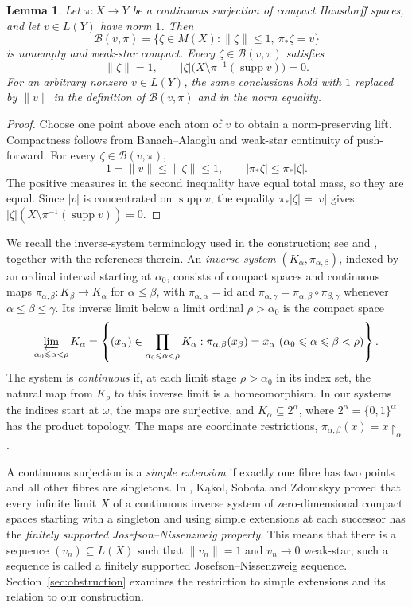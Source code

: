 \documentclass[a4paper,11pt]{amsart}
\theoremstyle{plain}
\newtheorem{lemma}[theorem]{Lemma}
\theoremstyle{definition}
\theoremstyle{remark}
\newcommand{\supp}{\operatorname{supp}}
\newcommand{\restr}[1]{{\restriction_{#1}}}
\numberwithin{equation}{section}
\begin{document}
\begin{lemma}\label{lem:lifts}
Let $\pi:X\to Y$ be a continuous surjection of compact Hausdorff spaces, and let $v\in L(Y)$ have norm $1$. Then
\[
\mathcal B(v,\pi)=\{\zeta\in M(X):\|\zeta\|\leqslant1,\ \pi_*\zeta=v\}
\]
is nonempty and weak-star compact. Every $\zeta\in\mathcal B(v,\pi)$
satisfies
\[
\|\zeta\|=1,\qquad |\zeta|\bigl(X\setminus\pi^{-1}(\supp v)\bigr)=0.
\]
For an arbitrary nonzero $v\in L(Y)$, the same conclusions hold with
$1$ replaced by $\|v\|$ in the definition of $\mathcal B(v,\pi)$ and in
the norm equality.
\end{lemma}
\begin{proof}
Choose one point above each atom of $v$ to obtain a norm-preserving lift. Compactness follows from Banach--Alaoglu and weak-star continuity of push-forward. For every $\zeta\in\mathcal B(v,\pi)$,
\[
1=\|v\|\leqslant\|\zeta\|\leqslant1,\qquad
|\pi_*\zeta|\leqslant\pi_*|\zeta|.
\]
The positive measures in the second inequality have equal total mass, so they are equal. Since $|v|$ is concentrated on $\supp v$, the equality $\pi_*|\zeta|=|v|$ gives $|\zeta|(X\setminus\pi^{-1}(\supp v))=0$.
\end{proof}

We recall the inverse-system terminology used in the construction; see
\cite[Sections~2.5 and 3.2]{Engelking} and
\cite[Section~20.5]{KKLPS}, together with the references therein.
An \emph{inverse system} $(K_\alpha,\pi_{\alpha,\beta})$, indexed by an
ordinal interval starting at $\alpha_0$, consists of compact spaces and continuous maps $\pi_{\alpha,\beta}:K_\beta\to K_\alpha$
for $\alpha\leqslant\beta$, with $\pi_{\alpha,\alpha}=\mathrm{id}$ and
$\pi_{\alpha,\gamma}=\pi_{\alpha,\beta}\circ\pi_{\beta,\gamma}$ whenever
$\alpha\leqslant\beta\leqslant\gamma$. Its inverse limit below a limit
ordinal $\rho>\alpha_0$ is the compact space
\[
\varprojlim_{\alpha_0\leqslant\alpha<\rho}K_\alpha
=\left\{(x_\alpha)\in\prod_{\alpha_0\leqslant\alpha<\rho}K_\alpha:
 \pi_{\alpha,\beta}(x_\beta)=x_\alpha\ (\alpha_0\leqslant\alpha\leqslant\beta<\rho)\right\}.
\]
The system is \emph{continuous} if, at each limit stage $\rho>\alpha_0$ in its
index set, the natural map from $K_\rho$ to this inverse limit is a
homeomorphism. In our systems the indices start at $\omega$, the maps
are surjective, and $K_\alpha\subseteq2^\alpha$, where
$2^\alpha=\{0,1\}^\alpha$ has the product topology. The maps are coordinate
restrictions, $\pi_{\alpha,\beta}(x)=x\restr{\alpha}$.

A continuous surjection is a \emph{simple extension} if exactly one fibre
has two points and all other fibres are singletons. In
\cite[Definition~6.1 and Theorem~6.10]{KSZ}, K\k{a}kol, Sobota and Zdomskyy
proved that every infinite limit $X$ of a continuous inverse system of
zero-dimensional compact spaces starting with a singleton and using
simple extensions at each successor has the \emph{finitely supported
Josefson--Nissenzweig property}. This means that there is a sequence
$(v_n)\subseteq L(X)$ such that $\|v_n\|=1$ and $v_n\to0$ weak-star;
such a sequence is called a finitely supported Josefson--Nissenzweig
sequence. Section~\ref{sec:obstruction} examines the restriction to
simple extensions and its relation to our construction.
\end{document}
